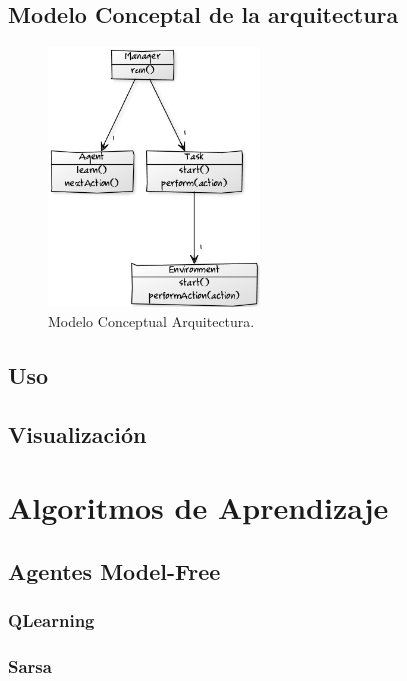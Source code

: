 \documentclass[a4paper,spanish] {article}
\begin{document}
	\subsection{Modelo Conceptal de la arquitectura}
	
	\begin{figure}[h!]
  \centering
    \includegraphics[width=0.5\textwidth]{MCarquitectra.png}
  \caption{Modelo Conceptual Arquitectura.}

\end{figure}
	
	
	\subsection{Uso}
	\subsection{Visualización}
	
\section{Algoritmos de Aprendizaje}
	\subsection{Agentes Model-Free}
		\subsubsection{QLearning}
		\subsubsection{Sarsa}
\end{document}
